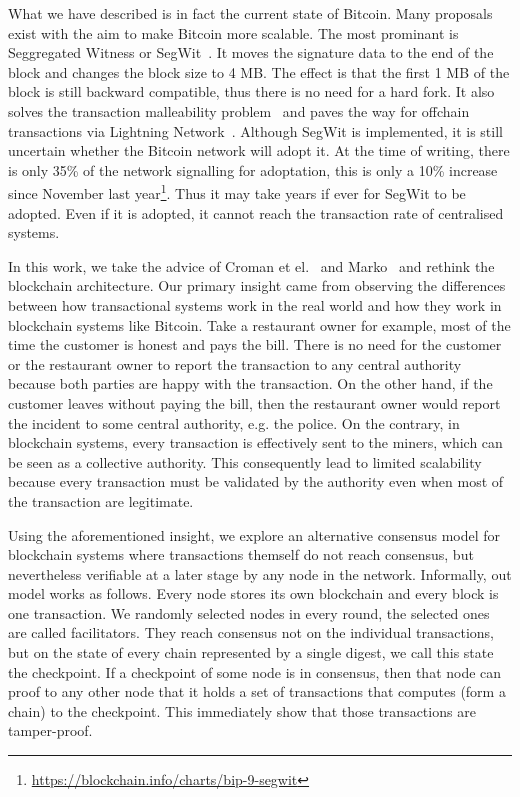 What we have described is in fact the current state of Bitcoin.
Many proposals exist with the aim to make Bitcoin more scalable.
The most prominant is Seggregated Witness or SegWit~\cite{segwit}.
It moves the signature data to the end of the block and changes the block size to 4 MB.
The effect is that the first 1 MB of the block is still backward compatible, thus there is no need for a hard fork.
It also solves the transaction malleability problem~\cite{bitcoinmalleability} and paves the way for offchain transactions via Lightning Network~\cite{lightningnetwork}.
Although SegWit is implemented, it is still uncertain whether the Bitcoin network will adopt it.
At the time of writing, there is only 35\% of the network signalling for adoptation,
this is only a 10\% increase since November last year\footnote{\url{https://blockchain.info/charts/bip-9-segwit}}.
Thus it may take years if ever for SegWit to be adopted.
Even if it is adopted, it cannot reach the transaction rate of centralised systems.

In this work, we take the advice of Croman et el.~\cite{croman2016scaling} and Marko~\cite{vukolic2015quest} and rethink the blockchain architecture.
Our primary insight came from observing the differences between how transactional systems work in the real world and how they work in blockchain systems like Bitcoin. 
Take a restaurant owner for example, most of the time the customer is honest and pays the bill.
There is no need for the customer or the restaurant owner to report the transaction to any central authority 
because both parties are happy with the transaction.
On the other hand, if the customer leaves without paying the bill,
then the restaurant owner would report the incident to some central authority, e.g. the police.
On the contrary, in blockchain systems, every transaction is effectively sent to the miners,
which can be seen as a collective authority.
This consequently lead to limited scalability because every transaction must be validated by the authority even when most of the transaction are legitimate.

Using the aforementioned insight,
we explore an alternative consensus model for blockchain systems where transactions themself do not reach consensus,
but nevertheless verifiable at a later stage by any node in the network.
Informally, out model works as follows.
Every node stores its own blockchain and every block is one transaction.
We randomly selected nodes in every round, the selected ones are called facilitators.
They reach consensus not on the individual transactions,
but on the state of every chain represented by a single digest, we call this state the checkpoint.
If a checkpoint of some node is in consensus, 
then that node can proof to any other node that it holds a set of transactions that computes (form a chain) to the checkpoint.
This immediately show that those transactions are tamper-proof.

